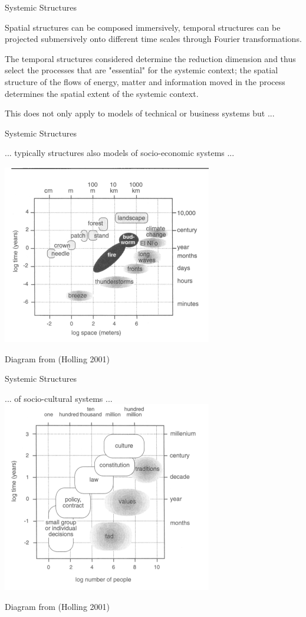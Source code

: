 \documentclass{beamer}
\begin{document}
\begin{frame}{Systemic Structures}

Spatial structures can be composed immersively, temporal structures can be
projected submersively onto different time scales through Fourier
transformations.

The temporal structures considered determine the reduction dimension and thus
select the processes that are "essential" for the systemic context; the
spatial structure of the flows of energy, matter and information moved in the
process determines the spatial extent of the systemic context.

This does not only apply to models of technical or business systems but ...
\end{frame}

\begin{frame}{Systemic Structures}

  ... typically structures also models of socio-economic systems ...
  \begin{center}
    \includegraphics[width=.6\textwidth]{Bilder/Holling-1.png}

    Diagram from (Holling 2001)
  \end{center}
\end{frame}

\begin{frame}{Systemic Structures}
  \begin{center}

    ... of socio-cultural systems ... 
    \includegraphics[width=.75\textwidth]{Bilder/Holling-2.png}

    Diagram from (Holling 2001)
  \end{center}
\end{frame}
\end{document}
